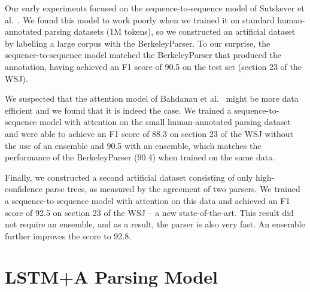 \documentclass{article} \usepackage{nips15submit_e,times}
\begin{document}
Our early experiments focused on the sequence-to-sequence model of
Sutskever et al.~\cite{sutskever14}.  We found this model to work poorly
when we trained it on standard human-annotated parsing datasets (1M tokens),
so we constructed an artificial dataset by labelling a large corpus with
the BerkeleyParser.  To our surprise, the sequence-to-sequence model
matched the BerkeleyParser that produced the annotation, having
achieved an F1 score of 90.5 on the test set (section 23 of the WSJ).

We suspected that the attention model of
Bahdanau et al.~\cite{bahdanau2014neural} might be more data efficient
and we found that it is indeed the case.  We trained a sequence-to-sequence
model with attention on the small human-annotated parsing dataset and were
able to achieve an F1 score of 88.3 on section 23 of the WSJ
without the use of an ensemble and 90.5 with an ensemble, which matches
the performance of the BerkeleyParser (90.4) when trained on the same data.

Finally, we constructed a second artificial dataset consisting of only
high-confidence parse trees, as measured by the agreement of two
parsers.  We trained a sequence-to-sequence model with attention on this
data and achieved an F1 score of 92.5 on section 23 of the WSJ -- a new
state-of-the-art.  This result did not require an ensemble, and as a result,
the parser is also very fast. An ensemble further improves the score to 92.8.
 \vspace{-0mm}
\section{LSTM+A Parsing Model}
\label{sec:model}

\newcommand\cb[1]{)$_{\mathrm{#1}}$}
\newcommand\pair[2]{$\langle$#1{$|$}#2$\rangle$}
\newcommand\eos{{\small \textsc{end}}}
\end{document}
